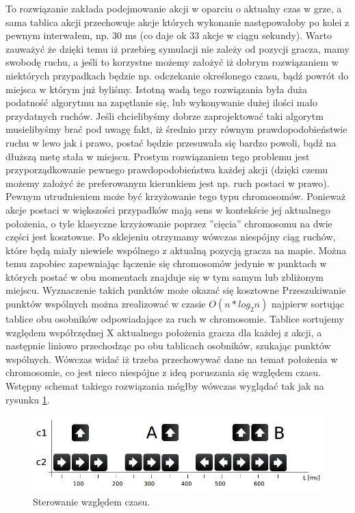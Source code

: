 \begin{par}
\begin{enumerate}
\begin{par}
		To rozwiązanie zakłada podejmowanie akcji w oparciu o aktualny czas w grze, a sama tablica akcji przechowuje akcje których wykonanie następowałoby po kolei z pewnym interwałem, np. 30 ms (co daje ok 33 akcje w ciągu sekundy).
		Warto zauważyć że dzięki temu iż przebieg symulacji nie zależy od pozycji gracza, mamy swobodę ruchu, a jeśli to korzystne możemy założyć iż dobrym rozwiązaniem w niektórych przypadkach będzie np. odczekanie określonego czasu, bądź powrót do miejsca w którym już byliśmy.
		Istotną wadą tego rozwiązania była duża podatność algorytmu na zapętlanie się, lub wykonywanie dużej ilości mało przydatnych ruchów. 
		Jeśli chcielibyśmy dobrze zaprojektować taki algorytm musielibyśmy brać pod uwagę fakt, iż średnio przy równym prawdopodobieństwie ruchu w lewo jak i prawo, postać będzie przesuwała się bardzo powoli, bądź na dłuższą metę stała w miejscu. Prostym rozwiązaniem tego problemu jest przyporządkowanie pewnego prawdopodobieństwa każdej akcji (dzięki czemu możemy założyć że preferowanym kierunkiem jest np. ruch postaci w prawo).
		Pewnym utrudnieniem może być krzyżowanie tego typu chromosomów. Ponieważ akcje postaci w większości przypadków mają sens w kontekście jej aktualnego położenia, o tyle klasyczne krzyżowanie poprzez ''cięcia'' chromosomu na dwie części jest kosztowne.
		Po sklejeniu otrzymamy wówczas niespójny ciąg ruchów, które będą miały niewiele wspólnego z aktualną pozycją gracza na mapie.
		Można temu zapobiec zapewniając łączenie się chromosomów jedynie w punktach w których postać w obu momentach znajduje się w tym samym lub zbliżonym miejscu. Wyznaczenie takich punktów może okazać się kosztowne
		Przeszukiwanie punktów wspólnych można zrealizować w czasie $O(n*log_2n)$ najpierw sortując tablice obu osobników odpowiadające za ruch w chromosomie. 
		Tablice sortujemy względem współrzędnej X aktualnego położenia gracza dla każdej z akcji, a następnie liniowo przechodząc po obu tablicach osobników, szukając punktów wspólnych.
		Wówczas widać iż trzeba przechowywać dane na temat położenia w chromosomie, co jest nieco niespójne z ideą poruszania się względem czasu.
		Wstępny schemat takiego rozwiązania mógłby wówczas wyglądać tak jak na rysunku \ref{fig:sterowanie}.
		
		\begin{par}
		\begin{figure}[!h]
		\centering
		\includegraphics[width=\textwidth]{obrazki/sterowanie.jpg}
		\caption{Sterowanie względem czasu.}
		\label{fig:sterowanie}
		\end{figure}
		\end{par}
		

\end{par}
\end{enumerate}
\end{par}
